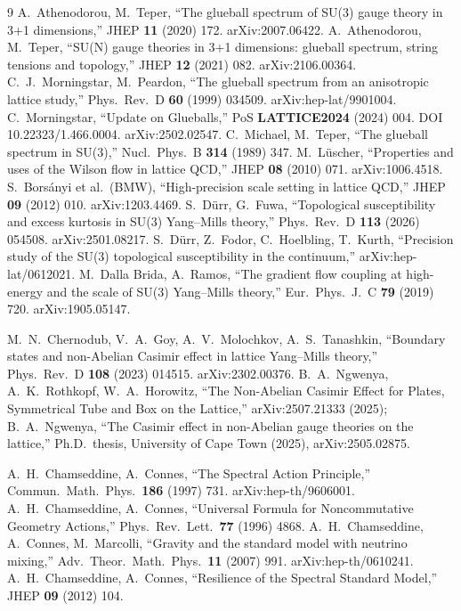 \documentclass[12pt,a4paper,twoside]{article}
\theoremstyle{plain}
\theoremstyle{definition}
\theoremstyle{remark}
\begin{document}
\begin{thebibliography}{9}
A.~Athenodorou, M.~Teper, ``The glueball spectrum of SU(3) gauge theory in 3+1 dimensions,'' JHEP \textbf{11} (2020) 172. arXiv:2007.06422.
A.~Athenodorou, M.~Teper, ``SU(N) gauge theories in 3+1 dimensions: glueball spectrum, string tensions and topology,'' JHEP \textbf{12} (2021) 082. arXiv:2106.00364.
C.~J.~Morningstar, M.~Peardon, ``The glueball spectrum from an anisotropic lattice study,'' Phys.\ Rev.\ D \textbf{60} (1999) 034509. arXiv:hep-lat/9901004.
C.~Morningstar, ``Update on Glueballs,'' PoS \textbf{LATTICE2024} (2024) 004. DOI 10.22323/1.466.0004. arXiv:2502.02547.
C.~Michael, M.~Teper, ``The glueball spectrum in SU(3),'' Nucl.\ Phys.\ B \textbf{314} (1989) 347.
M.~L\"uscher, ``Properties and uses of the Wilson flow in lattice QCD,'' JHEP \textbf{08} (2010) 071. arXiv:1006.4518.
S.~Bors\'anyi et al.\ (BMW), ``High-precision scale setting in lattice QCD,'' JHEP \textbf{09} (2012) 010. arXiv:1203.4469.
S.~D\"urr, G.~Fuwa, ``Topological susceptibility and excess kurtosis in SU(3) Yang--Mills theory,'' Phys.\ Rev.\ D \textbf{113} (2026) 054508. arXiv:2501.08217.
S.~D\"urr, Z.~Fodor, C.~Hoelbling, T.~Kurth, ``Precision study of the SU(3) topological susceptibility in the continuum,'' arXiv:hep-lat/0612021.
M.~Dalla Brida, A.~Ramos, ``The gradient flow coupling at high-energy and the scale of SU(3) Yang--Mills theory,'' Eur.\ Phys.\ J.\ C \textbf{79} (2019) 720. arXiv:1905.05147.

M.~N.~Chernodub, V.~A.~Goy, A.~V.~Molochkov, A.~S.~Tanashkin, ``Boundary states and non-Abelian Casimir effect in lattice Yang--Mills theory,'' Phys.\ Rev.\ D \textbf{108} (2023) 014515. arXiv:2302.00376.
B.~A.~Ngwenya, A.~K.~Rothkopf, W.~A.~Horowitz, ``The Non-Abelian Casimir Effect for Plates, Symmetrical Tube and Box on the Lattice,'' arXiv:2507.21333 (2025); B.~A.~Ngwenya, ``The Casimir effect in non-Abelian gauge theories on the lattice,'' Ph.D.\ thesis, University of Cape Town (2025), arXiv:2505.02875.

A.~H.~Chamseddine, A.~Connes, ``The Spectral Action Principle,'' Commun.\ Math.\ Phys.\ \textbf{186} (1997) 731. arXiv:hep-th/9606001.
A.~H.~Chamseddine, A.~Connes, ``Universal Formula for Noncommutative Geometry Actions,'' Phys.\ Rev.\ Lett.\ \textbf{77} (1996) 4868.
A.~H.~Chamseddine, A.~Connes, M.~Marcolli, ``Gravity and the standard model with neutrino mixing,'' Adv.\ Theor.\ Math.\ Phys.\ \textbf{11} (2007) 991. arXiv:hep-th/0610241.
A.~H.~Chamseddine, A.~Connes, ``Resilience of the Spectral Standard Model,'' JHEP \textbf{09} (2012) 104.


\end{thebibliography}
\end{document}

